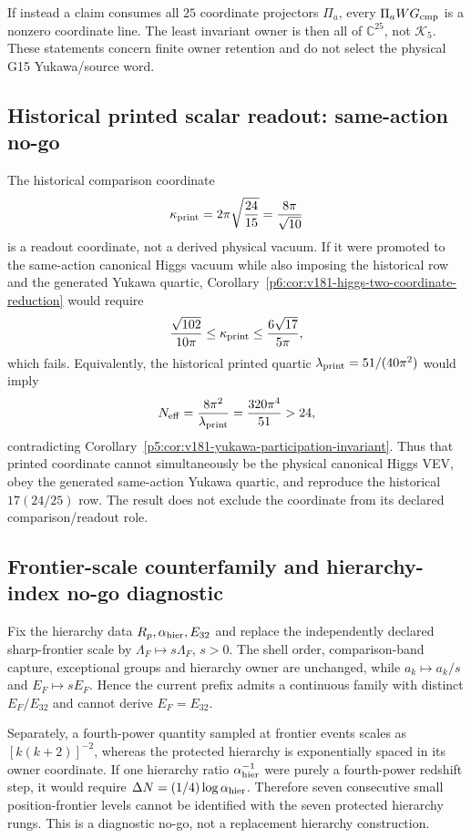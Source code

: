 \documentclass[11pt,a4paper]{article}
\begin{document}
If instead a claim consumes all $25$ coordinate projectors $\Pi_a$, every
$\Pi_aW G_{\rm cmp}$ is a nonzero coordinate line.  The least invariant owner is then
all of $\mathbb C^{25}$, not $\mathcal K_5$.  These statements concern finite
owner retention and do not select the physical G15 Yukawa/source word.


\subsection{Historical printed scalar readout: same-action no-go}
\label{p6:app:v181-printed-higgs-readout-no-go}
The historical comparison coordinate
\[
 \kappa_{\rm print}=2\pi\sqrt{\frac{24}{15}}=\frac{8\pi}{\sqrt{10}}
\]
is a readout coordinate, not a derived physical vacuum.  If it were promoted
to the same-action canonical Higgs vacuum while also imposing the historical
row and the generated Yukawa quartic, Corollary~\ref{p6:cor:v181-higgs-two-coordinate-reduction}
would require
\[
 \frac{\sqrt{102}}{10\pi}\le\kappa_{\rm print}
 \le\frac{6\sqrt{17}}{5\pi},
\]
which fails.  Equivalently, the historical printed quartic
$\lambda_{\rm print}=51/(40\pi^2)$ would imply
\[
 N_{\rm eff}=\frac{8\pi^2}{\lambda_{\rm print}}
 =\frac{320\pi^4}{51}>24,
\]
contradicting Corollary~\ref{p5:cor:v181-yukawa-participation-invariant}.
Thus that printed coordinate cannot simultaneously be the physical canonical
Higgs VEV, obey the generated same-action Yukawa quartic, and reproduce the
historical $17(24/25)$ row.  The result does not exclude the coordinate from
its declared comparison/readout role.



\subsection{Frontier-scale counterfamily and hierarchy-index no-go diagnostic}
\label{p6:app:v191-frontier-e32-counterfamily}
Fix the hierarchy data $R_p,\alpha_{\rm hier},E_{32}$ and replace the
independently declared sharp-frontier scale by
$\Lambda_F\mapsto s\Lambda_F$, $s>0$.  The shell order, comparison-band
capture, exceptional groups and hierarchy owner are unchanged, while
$a_k\mapsto a_k/s$ and $E_F\mapsto sE_F$.  Hence the current prefix admits a
continuous family with distinct $E_F/E_{32}$ and cannot derive
$E_F=E_{32}$.

Separately, a fourth-power quantity sampled at frontier events scales as
$[k(k+2)]^{-2}$, whereas the protected hierarchy is exponentially spaced in
its owner coordinate.  If one hierarchy ratio $\alpha_{\rm hier}^{-1}$ were
purely a fourth-power redshift step, it would require
$\Delta N=(1/4)\log\alpha_{\rm hier}$.  Therefore seven consecutive small
position-frontier levels cannot be identified with the seven protected
hierarchy rungs.  This is a diagnostic no-go, not a replacement hierarchy
construction.
\end{document}
